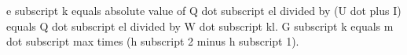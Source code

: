e subscript k equals absolute value of Q dot subscript el divided by (U dot plus I) equals Q dot subscript el divided by W dot subscript kl. G subscript k equals m dot subscript max times (h subscript 2 minus h subscript 1).
